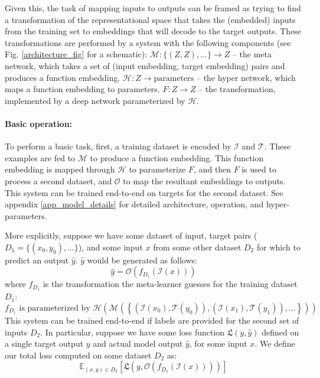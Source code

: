 \documentclass{article}
\begin{document}
Given this, the task of mapping inputs to outputs can be framed as trying to find a transformation of the representational space that takes the (embedded) inputs from the training set to embeddings that will decode to the target outputs. These transformations are performed by a system with the following components (see Fig. \ref{architecture_fig} for a schematic): $\mathcal{M}: \{(Z, Z), ...\} \rightarrow Z $ -- the meta network, which takes a set of (input embedding, target embedding) pairs and produces a function embedding. $\mathcal{H}: Z \rightarrow \text{parameters}$ -- the hyper network, which maps a function embedding to parameters. $F: Z \rightarrow Z$ -- the transformation, implemented by a deep network parameterized by $\mathcal{H}$. \par
\vspace{-0.5em}
\paragraph{Basic operation:} To perform a basic task, first, a training dataset is encoded by $\mathcal{I}$ and $\mathcal{T}$. These examples are fed to $\mathcal{M}$ to produce a function embedding. This function embedding is mapped through $\mathcal{H}$ to parameterize $F$, and then $F$ is used to process a second dataset, and $\mathcal{O}$ to map the resultant embeddings to outputs. This system can be trained end-to-end on targets for the second dataset. See appendix \ref{app_model_details} for detailed architecture, operation, and hyper-parameters. \par 
More explicitly, suppose we have some dataset of input, target pairs ($D_1 = \{(x_0, y_0), ...\}$), and some input $x$ from some other dataset $D_2$ for which to predict an output $\hat{y}$. $\hat{y}$ would be generated as follows: 
\[\hat{y} = \mathcal{O}\left(f_{D_1}\left(\mathcal{I} \left(x\right)\right) \right)\]
where $f_{D_1}$ is the transformation the meta-learner guesses for the training dataset $D_1$:
\[f_{D_1} \text{ is parameterized by } \mathcal{H}\left(\mathcal{M}\left( \left\{\left(\mathcal{I}\left(x_0\right), \mathcal{T}\left(y_0\right) \right), \left(\mathcal{I}\left(x_1\right), \mathcal{T}\left(y_1\right) \right), ... \right\}\right)\right)\]
This system can be trained end-to-end if labels are provided for the second set of inputs $D_2$. In particular, suppose we have some loss function $\mathfrak{L}(y, \hat{y})$ defined on a single target output $y$ and actual model output $\hat{y}$, for some input $x$. We define our total loss computed on some dataset $D_2$ as:
\[\mathbb{E}_{(x, y)\in {D}_2} \left[ \mathfrak{L}\left(y, \mathcal{O}\left(f_{D_1}\left(\mathcal{I} \left(x\right)\right) \right)\right)\right]\]
\end{document}
